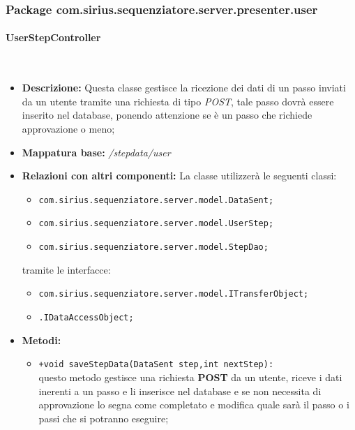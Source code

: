 \subsubsection{Package com.sirius.sequenziatore.server.presenter.user}
\paragraph{UserStepController}%
\
\begin{itemize}
	\item \textbf{Descrizione: } Questa classe gestisce la ricezione dei dati di un passo inviati da un utente tramite una richiesta di tipo \textit{POST}, tale passo dovrà essere inserito nel database, ponendo attenzione se è un passo che richiede approvazione o meno;
	\item \textbf{Mappatura base: } \textit{\slash stepdata\slash user}
	\item \textbf{Relazioni con altri componenti: }
	La classe utilizzerà le seguenti classi:
	\begin{itemize}
		\item \texttt{com.sirius.sequenziatore.server.model.DataSent;}
		\item \texttt{com.sirius.sequenziatore.server.model.UserStep;}
		\item \texttt{com.sirius.sequenziatore.server.model.StepDao;}
	\end{itemize}
	tramite le interfacce:
	\begin{itemize}
		\item \texttt{com.sirius.sequenziatore.server.model.ITransferObject;}
		\item \texttt{\sModel .IDataAccessObject;}
	\end{itemize}
	\item \textbf{Metodi: }\begin{itemize}
					\item \texttt{+void saveStepData(DataSent step,int nextStep):}\\
					questo metodo gestisce una richiesta \textbf{POST} da un utente, riceve i dati inerenti a un passo e li inserisce nel database e se non necessita di approvazione lo segna come completato e modifica quale sarà il passo o i passi che si potranno eseguire; 
				\end{itemize}
\end{itemize}
